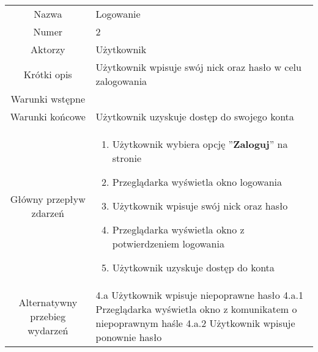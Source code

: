\documentclass[a4paper]{article}
\begin{document}
\begin{tabular}{c p{10cm}}
Nazwa&	Logowanie\\
Numer	& 2\\
Aktorzy &	Użytkownik\\
Krótki opis &  Użytkownik wpisuje swój nick oraz hasło w celu zalogowania\\
Warunki wstępne&	\\
Warunki końcowe&	Użytkownik uzyskuje dostęp do swojego konta\\
Główny przepływ zdarzeń&
\begin{enumerate}
\item Użytkownik wybiera opcję ''\textbf{Zaloguj}'' na stronie 
\item Przeglądarka wyświetla okno logowania
\item Użytkownik wpisuje swój nick oraz hasło
\item Przeglądarka wyświetla okno z potwierdzeniem logowania
\item Użytkownik uzyskuje dostęp do konta

\end{enumerate} \\
Alternatywny przebieg wydarzeń & 
4.a Użytkownik wpisuje niepoprawne hasło \newline
4.a.1 Przeglądarka wyświetla okno z komunikatem o niepoprawnym haśle \newline
4.a.2 Użytkownik wpisuje ponownie hasło\newline
\\
\hline
\end{tabular}
\newline
\newline
\end{document}

